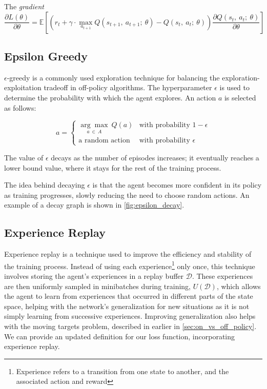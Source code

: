 \begin{definition}
  The \textit{gradient}
  $$\frac{\partial{L(\theta)}}{\partial
      \theta}=\mathbb{E}\left[\left(r_t+\gamma\cdot\max_{a_{t+1}}Q(s_{t+1},~a_{t+1};~\theta)-Q(s_{t},~a_{t};~\theta)\right)\frac{\partial{Q(s_{t},~a_{t};~\theta)}}{\partial\theta}\right]$$
\end{definition}

\subsection{Epsilon Greedy} \label{sec:epsilon_greedy}
$\epsilon$-greedy is a commonly used exploration technique for balancing the exploration-exploitation
tradeoff in off-policy algorithms. The hyperparameter $\epsilon$ is used to
determine the probability with which the agent explores. An action $a$ is selected as follows:

$$
  a =
  \begin{cases}
    \underset{a~\in~A}{\arg\max}~Q(a) & \text{with probability } 1-\epsilon \\
    \text{a random action }           & \text{with probability } \epsilon
  \end{cases}
$$

The value of $\epsilon$ decays as the number of episodes increases; it
eventually reaches a lower bound value, where it stays for the rest of the
training process.

The idea behind decaying $\epsilon$ is that the agent becomes more confident in
its policy as training progresses, slowly reducing the need to choose random
actions. An example of a decay graph is shown in \autoref{fig:epsilon_decay}.



\subsection{Experience Replay} \label{sec:experience_replay}

Experience replay is a technique used to improve the efficiency and stability
of the training process. Instead of using each experience\footnote{Experience
  refers to a transition from one state to another, and the associated action and
  reward} only once, this technique involves storing the agent's experiences in a
replay buffer $\mathcal{D}$. These experiences are then uniformly sampled in
minibatches during training, $U(\mathcal{D})$, which allows the agent to learn
from experiences that occurred in different parts of the state space, helping
with the network's generalization for new situations as it is not simply
learning from successive experiences. Improving generalization also helps with
the moving targets problem, described in earlier in
\autoref{sec:on_vs_off_policy}. We can provide an updated definition for our
loss function, incorporating experience replay.

